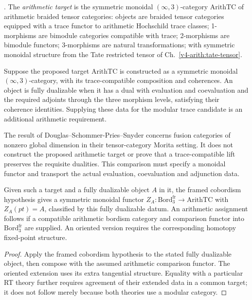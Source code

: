 \begin{definition}
\label{v4-arith:w10-a:def:arith-target}
\ClaimStatusDefinitional. The \emph{arithmetic target} is the
symmetric monoidal \((\infty,3)\)-category
\(\mathrm{ArithTC}\) of arithmetic braided tensor categories:
objects are braided tensor categories equipped with a trace functor to
arithmetic Hochschild trace classes; 1-morphisms are bimodule
categories compatible with trace; 2-morphisms are bimodule functors;
3-morphisms are natural transformations; with symmetric monoidal
structure from the Tate restricted tensor of
Ch.~\ref{v4-arith:tate-tensor}.
\end{definition}

\begin{proposition}
\label{v4-arith:w10-a:prop:fully-dualizable-candidate}
Suppose the proposed target $\mathrm{ArithTC}$ is constructed as a
symmetric monoidal $(\infty,3)$-category, with its trace-compatible
composition and coherences. An object is fully dualizable when it
has a dual with evaluation and coevaluation and the required adjoints
through the three morphism levels, satisfying their coherence identities.
Supplying these data for the modular trace candidate is an additional
arithmetic requirement.
\end{proposition}
The result of Douglas--Schommer-Pries--Snyder concerns fusion
categories of nonzero global dimension in their tensor-category
Morita setting. It does not construct the proposed arithmetic target
or prove that a trace-compatible lift preserves the requisite dualities.
This comparison must specify a monoidal functor and transport the
actual evaluation, coevaluation and adjunction data.

\begin{theorem}
\label{v4-arith:w10-a:thm:cobord-output}
Given such a target and a fully dualizable object $A$ in it,
the framed cobordism hypothesis gives a symmetric monoidal functor
$Z_A:\mathrm{Bord}_3^{\mathrm{fr}}\to\mathrm{ArithTC}$ with $Z_A(pt)=A$,
classified by this fully dualizable datum.
An arithmetic assignment follows if a compatible arithmetic bordism
category and comparison functor into $\mathrm{Bord}_3^{\mathrm{fr}}$
are supplied. An oriented version requires the corresponding
homotopy fixed-point structure.
\end{theorem}
\begin{proof}
Apply the framed cobordism hypothesis to the stated fully dualizable
object, then compose with the assumed arithmetic comparison functor.
The oriented extension uses its extra tangential structure.
Equality with a particular RT theory further requires agreement
of their extended data in a common target; it does not follow
merely because both theories use a modular category.
\end{proof}


